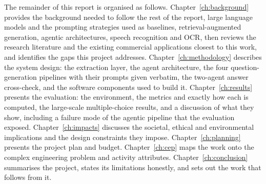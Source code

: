 The remainder of this report is organised as follows.
Chapter~\ref{ch:background} provides the background needed to follow the rest
of the report, large language models and the prompting strategies used as
baselines, retrieval-augmented generation, agentic architectures, speech
recognition and OCR, then reviews the research literature and the existing
commercial applications closest to this work, and identifies the gaps this
project addresses. Chapter~\ref{ch:methodology} describes the system design:
the extraction layer, the agent architecture, the four question-generation
pipelines with their prompts given verbatim, the two-agent answer cross-check,
and the software components used to build it. Chapter~\ref{ch:results}
presents the evaluation: the environment, the metrics and exactly how each is
computed, the large-scale multiple-choice results, and a discussion of what
they show, including a failure mode of the agentic pipeline that the
evaluation exposed. Chapter~\ref{ch:impacts} discusses the societal, ethical
and environmental implications and the design constraints they impose.
Chapter~\ref{ch:planning} presents the project plan and budget.
Chapter~\ref{ch:cep} maps the work onto the complex engineering problem and
activity attributes. Chapter~\ref{ch:conclusion} summarises the project,
states its limitations honestly, and sets out the work that follows from it.
